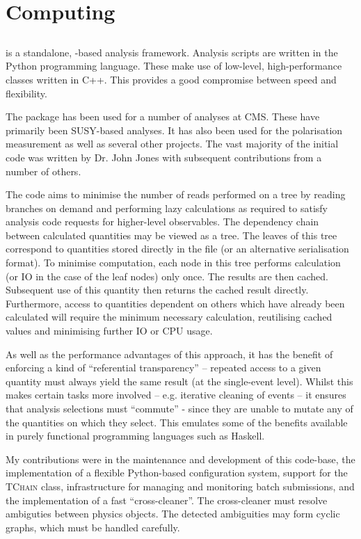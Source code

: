 \chapter{Computing}
\section{}
 is a standalone, \root-based analysis framework. Analysis
scripts are written in the Python programming language. These make use of
low-level, high-performance classes written in C++. This provides a good
compromise between speed and flexibility.

The  package has been used for a number of analyses at
\ac{CMS}. These have primarily been \ac{SUSY}-based analyses. It has also been
used for the \PW polarisation measurement as well as several other projects. The
vast majority of the initial code was written by Dr. John Jones with subsequent
contributions from a number of others.

The  code aims to minimise the number of reads performed on a
\root tree by reading branches on demand and performing lazy calculations as
required to satisfy analysis code requests for higher-level observables. The
dependency chain between calculated quantities may be viewed as a tree. The
leaves of this tree correspond to quantities stored directly in the \root
file (or an alternative serialisation format). To minimise computation, each
node in this tree performs calculation (or \ac{IO} in the case of the leaf nodes)
only once. The results are then cached. Subsequent use of this quantity then
returns the cached result directly. Furthermore, access to quantities dependent
on others which have already been calculated will require the minimum necessary
calculation, reutilising cached values and minimising further \ac{IO} or CPU
usage.

As well as the performance advantages of this approach, it has the benefit of
enforcing a kind of ``referential transparency'' -- repeated access to a given
quantity must always yield the same result (at the single-event level). Whilst
this makes certain tasks more involved -- e.g. iterative cleaning of events --
it ensures that analysis selections must ``commute'' - since they are unable to
mutate any of the quantities on which they select. This emulates some of the
benefits available in purely functional programming languages such as Haskell.

My contributions were in the maintenance and development of this code-base, the
implementation of a flexible Python-based configuration system, support for the
\root \textsc{TChain} class, infrastructure for managing and monitoring
batch submissions, and the implementation of a fast ``cross-cleaner''. The
cross-cleaner must resolve ambiguties between physics objects. The detected
ambiguities may form cyclic graphs, which must be handled carefully.
